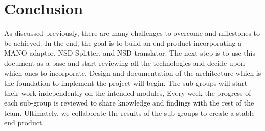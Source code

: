 \chapter{Conclusion}
\label{ch:Conclusion}
As discussed previously, there are many challenges to overcome and milestones to be achieved.
In the end, the goal is to build an end product incorporating a MANO adaptor, NSD Splitter, and NSD translator. The next step is to use this document as a base and start reviewing all the technologies and decide upon which ones to incorporate. Design and documentation of the architecture which is the foundation to implement the project will begin.
The sub-groups will start their work independently on the intended modules,  Every week the progress of each sub-group is reviewed to share knowledge and findings with the rest of the team. Ultimately, we collaborate the results of the sub-groups to create a stable end product.
